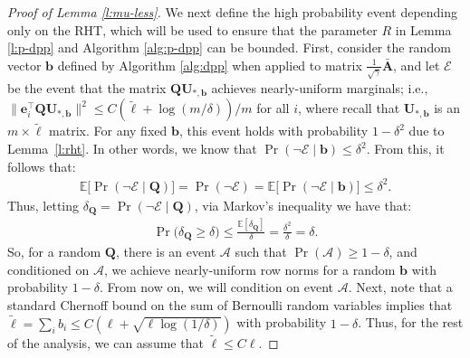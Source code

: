 \documentclass[11pt]{article}
\let\origtop\top
\renewcommand\top{{\scriptscriptstyle{\origtop}}}
\def\e{{\mathbf e}}
\def\b{{\mathbf b}}
\def\A{{\mathbf A}}
\def\Q{{\mathbf Q}}
\def\Ec{{\mathcal E}}
\def\E{{\mathds E}}
\def\U{{\mathbf U}}
\begin{document}
\begin{proof}[Proof of Lemma \ref{l:mu-less}]
We next define the high probability event depending only on the RHT, which will be used to ensure that the parameter $R$ in Lemma \ref{l:p-dpp} and Algorithm \ref{alg:p-dpp} can be bounded. First, consider the random vector $\b$ defined by Algorithm \ref{alg:dpp} when applied to matrix $\frac{1}{\sqrt{{\gamma}}}\bar\A$, and let $\Ec$ be the event that the matrix $\Q\U_{*,\b}$ achieves nearly-uniform marginals; i.e., $\|\e_i^\top\Q\U_{*,\b}\|^2 \leq C(\tilde \ell+\log(m/\delta))/m$ for all $i$, where recall that $\U_{*,\b}$ is an $m\times \tilde\ell$ matrix. For any fixed $\b$, this event holds with probability $1-\delta^2$ due to Lemma~\ref{l:rht}. In other words, we know that $\Pr(\neg\Ec\mid\b)\leq \delta^2$. From this, it follows that:
  \begin{align*}
   \E\big[\Pr(\neg\Ec\mid\Q)\big] = \Pr(\neg\Ec) = \E\big[\Pr(\neg\Ec\mid\b)\big] \leq \delta^2.
  \end{align*}
  Thus, letting $\delta_{\Q}=\Pr(\neg\Ec\mid\Q)$, via Markov's inequality we have that:
    \begin{align*}
    \Pr\big(\delta_\Q \geq \delta\big)\leq \frac{\E[\delta_\Q]}{\delta} = \frac{\delta^2}{\delta} = \delta.
  \end{align*}
  So, for a random $\Q$,
  there is an event $\mathcal{A}$ such that $\Pr(\mathcal{A})\geq 1-\delta$, and
  conditioned on $\mathcal{A}$, we achieve nearly-uniform row norms for a random $\b$
  with probability $1-\delta$. From now on, we will condition on event $\mathcal A$. 
  Next, note that a standard Chernoff bound on the sum of Bernoulli random variables implies that 
   $\tilde \ell=\sum_ib_i \leq C(\ell + \sqrt{\ell \log(1/\delta)})$ 
  with probability $1-\delta$. Thus, for the rest of the analysis, we can assume that $\tilde \ell \leq C\ell$. 
  

\end{proof}
\end{document}
